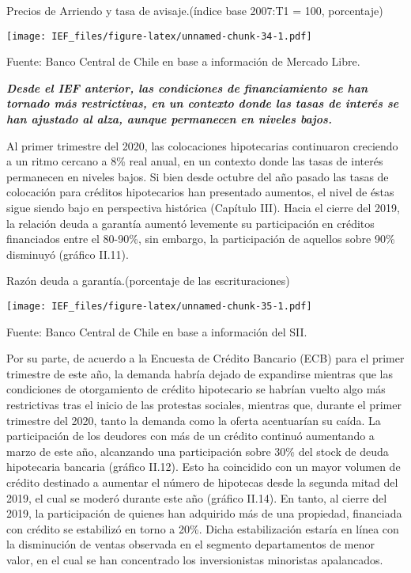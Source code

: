 \documentclass[
]{book}
\begin{document}
Precios de Arriendo y tasa de avisaje.(índice base 2007:T1 = 100, porcentaje)

\texttt{[image: IEF\_files/figure-latex/unnamed-chunk-34-1.pdf]}

Fuente: Banco Central de Chile en base a información de Mercado Libre.

\textbf{\emph{Desde el IEF anterior, las condiciones de financiamiento se han
tornado más restrictivas, en un contexto donde las tasas de interés
se han ajustado al alza, aunque permanecen en niveles bajos.}}

Al primer trimestre del 2020, las colocaciones hipotecarias continuaron
creciendo a un ritmo cercano a 8\% real anual, en un contexto donde las tasas
de interés permanecen en niveles bajos. Si bien desde octubre del año pasado
las tasas de colocación para créditos hipotecarios han presentado aumentos, el
nivel de éstas sigue siendo bajo en perspectiva histórica (Capítulo III).
Hacia el cierre del 2019, la relación deuda a garantía aumentó levemente
su participación en créditos financiados entre el 80-90\%, sin embargo, la
participación de aquellos sobre 90\% disminuyó (gráfico II.11).

Razón deuda a garantía.(porcentaje de las escrituraciones)

\texttt{[image: IEF\_files/figure-latex/unnamed-chunk-35-1.pdf]}

Fuente: Banco Central de Chile en base a información del SII.

Por su parte, de acuerdo a la Encuesta de Crédito Bancario (ECB) para el primer
trimestre de este año, la demanda habría dejado de expandirse mientras que
las condiciones de otorgamiento de crédito hipotecario se habrían vuelto algo
más restrictivas tras el inicio de las protestas sociales, mientras que, durante
el primer trimestre del 2020, tanto la demanda como la oferta acentuarían su
caída.
La participación de los deudores con más de un crédito continuó aumentando
a marzo de este año, alcanzando una participación sobre 30\% del stock de
deuda hipotecaria bancaria (gráfico II.12). Esto ha coincidido con un mayor
volumen de crédito destinado a aumentar el número de hipotecas desde la
segunda mitad del 2019, el cual se moderó durante este año (gráfico II.14).
En tanto, al cierre del 2019, la participación de quienes han adquirido más
de una propiedad, financiada con crédito se estabilizó en torno a 20\%. Dicha
estabilización estaría en línea con la disminución de ventas observada en el
segmento departamentos de menor valor, en el cual se han concentrado los
inversionistas minoristas apalancados.
\end{document}
